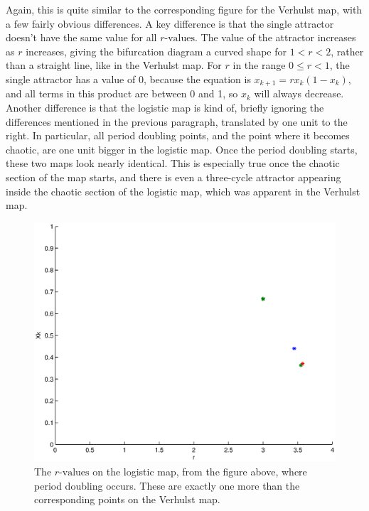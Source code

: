\documentclass[a4wide, 10pt]{article}
\begin{document}
Again, this is quite similar to the corresponding figure for the Verhulst map, with a few fairly
 obvious differences. %
  A key difference is that the single attractor doesn't have the same value for all $r \textrm{-values}$. The value of the attractor
     increases as $r$ increases, giving the bifurcation diagram a curved shape for $1 < r < 2$, rather
     than a straight line, like in the Verhulst map. For $r$ in the range $0 \leq r < 1$, the
       single attractor has a value of 0, because the equation is $x_{k + 1} = rx_{k}(1 - x_{k})$, and
        all terms in this product are between 0 and 1, so $x_{k}$ will always decrease. 
Another difference is that the logistic map is kind of, briefly ignoring
 the differences mentioned in the previous paragraph, translated by one unit to the right. 
 In particular, all period doubling points, and the point where it becomes chaotic, are one unit bigger in the logistic map.
Once the period doubling starts, these two maps look nearly identical. This is especially true
 once the chaotic section of the map starts, and there is even a three-cycle attractor appearing inside
  the chaotic section of the logistic map, which was apparent in the Verhulst map. 

\begin{figure}[H]

    \centering

    \includegraphics[scale=0.2]{EPSFiles/MAINLogisticPointsEPS}

    \caption{The $r \textrm{-values}$ on the logistic map, from the figure above, where period doubling
     occurs. These are exactly one more than the corresponding points on the Verhulst map.}

\end{figure} 
\end{document}
